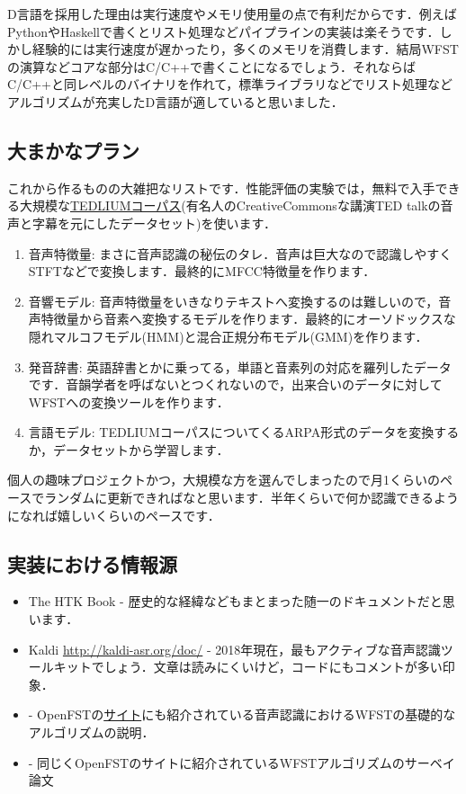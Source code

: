 \documentclass[11pt]{article}
\begin{document}
D言語を採用した理由は実行速度やメモリ使用量の点で有利だからです．例えばPythonやHaskellで書くとリスト処理などパイプラインの実装は楽そうです．しかし経験的には実行速度が遅かったり，多くのメモリを消費します\cite{Shinozaki2012}．結局WFSTの演算などコアな部分はC/C++で書くことになるでしょう．それならばC/C++と同レベルのバイナリを作れて，標準ライブラリなどでリスト処理などアルゴリズムが充実したD言語が適していると思いました．
\subsection{大まかなプラン}
\label{sec:org31834cd}

これから作るものの大雑把なリストです．性能評価の実験では，無料で入手できる大規模な\href{http://www-lium.univ-lemans.fr/en/content/ted-lium-corpus}{TEDLIUMコーパス}(有名人のCreativeCommonsな講演TED talkの音声と字幕を元にしたデータセット)を使います．

\begin{enumerate}
\item 音声特徴量: まさに音声認識の秘伝のタレ．音声は巨大なので認識しやすくSTFTなどで変換します．最終的にMFCC特徴量を作ります．
\item 音響モデル: 音声特徴量をいきなりテキストへ変換するのは難しいので，音声特徴量から音素へ変換するモデルを作ります．最終的にオーソドックスな隠れマルコフモデル(HMM)と混合正規分布モデル(GMM)を作ります．
\item 発音辞書: 英語辞書とかに乗ってる，単語と音素列の対応を羅列したデータです．音韻学者を呼ばないとつくれないので，出来合いのデータに対してWFSTへの変換ツールを作ります．
\item 言語モデル: TEDLIUMコーパスについてくるARPA形式のデータを変換するか，データセットから学習します．
\end{enumerate}

個人の趣味プロジェクトかつ，大規模な方を選んでしまったので月1くらいのペースでランダムに更新できればなと思います．半年くらいで何か認識できるようになれば嬉しいくらいのペースです．


\subsection{実装における情報源}
\label{sec:org1630ad4}

\begin{itemize}
\item The HTK Book \cite{Young2015} - 歴史的な経緯などもまとまった随一のドキュメントだと思います．
\item Kaldi \url{http://kaldi-asr.org/doc/} - 2018年現在，最もアクティブな音声認識ツールキットでしょう．文章は読みにくいけど，コードにもコメントが多い印象．
\item \cite{Mohri2008} - OpenFSTの\href{http://www.openfst.org/twiki/bin/view/FST/FstBackground}{サイト}にも紹介されている音声認識におけるWFSTの基礎的なアルゴリズムの説明．
\item \cite{Mohri2009} - 同じくOpenFSTのサイトに紹介されているWFSTアルゴリズムのサーベイ論文
\end{itemize}
\end{document}
